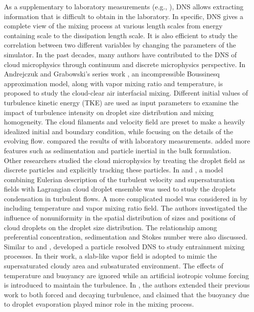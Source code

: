 As a supplementary to laboratory measurements (e.g., \cite{Malinowski2008}),
DNS allows extracting information that is difficult to obtain in the
laboratory. In specific, DNS gives a complete view of the mixing process at
various length scales from energy containing scale to the dissipation length
scale. It is also efficient to study the correlation between two different
variables by changing the parameters of the simulator. In the past decades,
many authors have contributed to the DNS of cloud microphysics through
continuum and discrete microphysics perspective. In Andrejczuk and Grabowski's
series work \cite{And04,And06,And09}, an incompressible Boussinesq
approximation model, along with vapor mixing ratio and temperature, is proposed
to study the cloud-clear air interfacial mixing. Different initial values of
turbulence kinetic energy (TKE) are used as input parameters to examine the
impact of turbulence intensity on droplet size distribution and mixing
homogeneity. The cloud filaments and velocity field are preset to make a
heavily idealized initial and boundary condition, while focusing on the details
of the evolving flow. \cite{Malinowski2008} compared the results of
\cite{And04,And06} with laboratory measurements. \cite{Lozar2014} added more
features such as sedimentation and particle inertial in the bulk formulation.
Other researchers studied the cloud microphysics by treating the droplet field
as discrete particles and explicitly tracking these particles. In
\cite{Lanotte2009} and \cite{Celani05}, a model combining Eulerian description
of the turbulent velocity and supersaturation fields with Lagrangian cloud
droplet ensemble was used to study the droplets condensation in turbulent
flows. A more complicated model was considered in
\cite{Vaillancourt00,Vaillancourt02} by including temperature and vapor mixing
ratio field. The authors investigated the influence of nonuniformity in the
spatial distribution of sizes and positions of cloud droplets on the droplet
size distribution. The relationship among preferential concentration,
sedimentation and Stokes number were also discussed.  Similar to
\cite{Vaillancourt02} and \cite{Lanotte2009}, \cite{Kumar11,Kumar12} developed
a particle resolved DNS to study entrainment mixing processes. In their work, a
slab-like vapor field is adopted to mimic the supersaturated cloudy area and
subsaturated environment. The effects of temperature and buoyancy are ignored
while an artificial isotropic volume forcing is introduced to maintain the
turbulence. In \cite{Kumar14}, the authors extended their previous work to both
forced and decaying turbulence, and claimed that the buoyancy due to droplet
evaporation played minor role in the mixing process.

